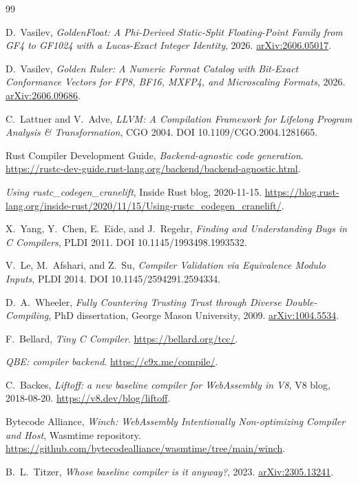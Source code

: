 \documentclass[11pt,a4paper]{article}
\begin{document}
\begin{thebibliography}{99}

D.~Vasilev,
\emph{GoldenFloat: A Phi-Derived Static-Split Floating-Point Family from GF4 to GF1024 with a Lucas-Exact Integer Identity},
2026.
\href{https://arxiv.org/abs/2606.05017}{arXiv:2606.05017}.

D.~Vasilev,
\emph{Golden Ruler: A Numeric Format Catalog with Bit-Exact Conformance Vectors for FP8, BF16, MXFP4, and Microscaling Formats},
2026.
\href{https://arxiv.org/abs/2606.09686}{arXiv:2606.09686}.

C.~Lattner and V.~Adve,
\emph{LLVM: A Compilation Framework for Lifelong Program Analysis \& Transformation},
CGO 2004.
DOI 10.1109/CGO.2004.1281665.

Rust Compiler Development Guide,
\emph{Backend-agnostic code generation}.
\url{https://rustc-dev-guide.rust-lang.org/backend/backend-agnostic.html}.

\emph{Using rustc\_codegen\_cranelift},
Inside Rust blog, 2020-11-15.
\url{https://blog.rust-lang.org/inside-rust/2020/11/15/Using-rustc_codegen_cranelift/}.

X.~Yang, Y.~Chen, E.~Eide, and J.~Regehr,
\emph{Finding and Understanding Bugs in C Compilers},
PLDI 2011.
DOI 10.1145/1993498.1993532.

V.~Le, M.~Afshari, and Z.~Su,
\emph{Compiler Validation via Equivalence Modulo Inputs},
PLDI 2014.
DOI 10.1145/2594291.2594334.

D.~A.~Wheeler,
\emph{Fully Countering Trusting Trust through Diverse Double-Compiling},
PhD dissertation, George Mason University, 2009.
\href{https://arxiv.org/abs/1004.5534}{arXiv:1004.5534}.

F.~Bellard,
\emph{Tiny C Compiler}.
\url{https://bellard.org/tcc/}.

\emph{QBE: compiler backend}.
\url{https://c9x.me/compile/}.

C.~Backes,
\emph{Liftoff: a new baseline compiler for WebAssembly in V8},
V8 blog, 2018-08-20.
\url{https://v8.dev/blog/liftoff}.

Bytecode Alliance,
\emph{Winch: WebAssembly Intentionally Non-optimizing Compiler and Host},
Wasmtime repository.
\url{https://github.com/bytecodealliance/wasmtime/tree/main/winch}.

B.~L.~Titzer,
\emph{Whose baseline compiler is it anyway?},
2023.
\href{https://arxiv.org/abs/2305.13241}{arXiv:2305.13241}.


\end{thebibliography}
\end{document}
